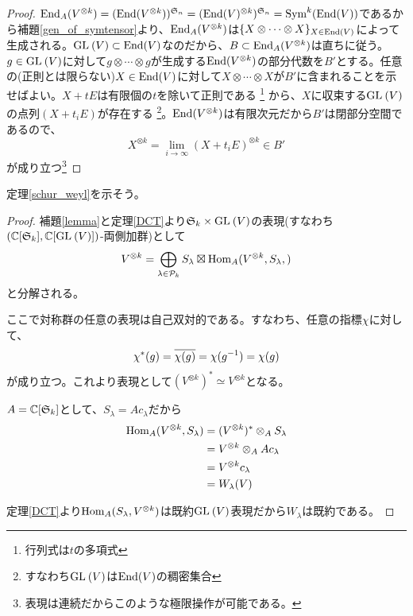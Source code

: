 \documentclass{ltjsreport}
\begin{document}
\begin{proof}
  $\text{End}_A(V^{\otimes k})=(\text{End}(V^{\otimes k}))^{\mathfrak{S}_n}=(\text{End}(V)^{\otimes k})^{\mathfrak{S}_n}=\text{Sym}^k(\text{End}(V))$であるから補題\ref{gen_of_symtensor}より、$\text{End}_A(V^{\otimes k})$は$\{X\otimes\cdots\otimes X\}_{X\in\text{End}(V)}$によって生成される。$\text{GL}\:(V)\subset\text{End}(V)$なのだから、$B\subset \text{End}_A(V^{\otimes k})$は直ちに従う。$g\in\text{GL}\:(V)$に対して$g\otimes \cdots\otimes g$が生成する$\text{End}(V^{\otimes k})$の部分代数を$B'$とする。任意の(正則とは限らない)$X\in\text{End}(V)$に対して$X\otimes \cdots\otimes X$が$B'$に含まれることを示せばよい。$X+tE$は有限個の$t$を除いて正則である
  \footnote{
    行列式は$t$の多項式
  }
  から、$X$に収束する$\text{GL}\:(V)$の点列$(X+t_iE)$が存在する
  \footnote{
    すなわち$\text{GL}\:(V)$は$\text{End}(V)$の稠密集合
  }。$\text{End}(V^{\otimes k})$は有限次元だから$B'$は閉部分空間であるので、
  \[
  X^{\otimes k}=\lim_{i\rightarrow\infty}(X+t_iE)^{\otimes k}\in B'  
  \]
  が成り立つ\footnote{
    表現は連続だからこのような極限操作が可能である。
  }
\end{proof}

定理\ref{schur_weyl}を示そう。
\begin{proof}
  補題\ref{lemma}と定理\ref{DCT}より$\mathfrak{S}_k\times\text{GL}\:(V)$の表現(すなわち$(\mathbb{C}[\mathfrak{S}_k],\mathbb{C}[\text{GL}\:(V)])$-両側加群)として
  \[
  V^{\otimes k}=\bigoplus_{\lambda\in\mathcal{P}_k}S_\lambda\boxtimes \text{Hom}_A(V^{\otimes k},S_\lambda,)  
  \]
  と分解される。
  
  ここで対称群の任意の表現は自己双対的である。すなわち、任意の指標$\chi$に対して、
  \[
  \chi^*(g)=\overline{\chi(g)}=\chi(g^{-1})=\chi(g)  
  \]
  が成り立つ。これより表現として$(V^{\otimes k})^*\simeq V^{\otimes k}$となる。

  $A=\mathbb{C}[\mathfrak{S}_k]$として、$S_\lambda=Ac_\lambda$だから
  \begin{align*}
    \text{Hom}_A(V^{\otimes k},S_\lambda)
    &=(V^{\otimes k})^*\otimes_AS_\lambda\\
    &=V^{\otimes k}\otimes_AAc_\lambda\\
    &=V^{\otimes k}c_\lambda\\
    &=W_\lambda(V)
  \end{align*}

  定理\ref{DCT}より$\text{Hom}_A(S_\lambda,V^{\otimes k})$は既約$\text{GL}\:(V)$表現だから$W_\lambda$は既約である。
\end{proof}
\end{document}
